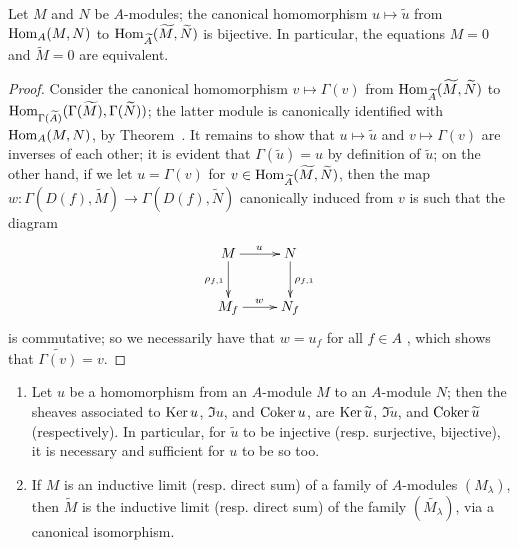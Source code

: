 \begin{corollary}[1.3.8]
\label{I.1.3.8}
Let $M$ and $N$ be $A$-modules;
the canonical homomorphism $u\mapsto\widetilde{u}$ from $\operatorname{Hom}_A(M,N)$ to $\operatorname{Hom}_{\widetilde{A}}(\widetilde{M},\widetilde{N})$ is bijective.
In particular, the equations $M=0$ and $\widetilde{M}=0$ are equivalent.
\end{corollary}

\begin{proof}
Consider the canonical homomorphism $v\mapsto\Gamma(v)$ from $\operatorname{Hom}_{\widetilde{A}}(\widetilde{M},\widetilde{N})$ to $\operatorname{Hom}_{\Gamma(\widetilde{A})}(\Gamma(\widetilde{M}),\Gamma(\widetilde{N}))$;
the latter module is canonically identified with $\operatorname{Hom}_A(M,N)$, by Theorem~.
It remains to show that $u\mapsto\widetilde{u}$ and $v\mapsto\Gamma(v)$ are inverses of each other;
it is evident that $\Gamma(\widetilde{u})=u$ by definition of $\widetilde{u}$;
on the other hand, if we let $u=\Gamma(v)$ for $v\in\operatorname{Hom}_{\widetilde{A}}(\widetilde{M},\widetilde{N})$, then the map $w:\Gamma(D(f),\widetilde{M})\to\Gamma(D(f),\widetilde{N})$ canonically induced from $v$ is such that the diagram
\[
  \xymatrix{
    M\ar[r]^u\ar[d]_{\rho_{f,1}} & N\ar[d]^{\rho_{f,1}}\\
    M_f\ar[r]^w & N_f
  }
\]
is commutative;
so we necessarily have that $w=u_f$ for all $f\in A$ , which shows that $\widetilde{\Gamma(v)}=v$.
\end{proof}

\begin{corollary}[1.3.9]
\label{I.1.3.9}
\medskip\noindent
\begin{enumerate}
  \item[{\rm(i)}] Let $u$ be a homomorphism from an $A$-module $M$ to an $A$-module $N$;
    then the sheaves associated to $\operatorname{Ker} u$, $\Im u$, and $\operatorname{Coker} u$, are $\operatorname{Ker}\widetilde{u}$, $\Im\widetilde{u}$, and $\operatorname{Coker}\widetilde{u}$ (respectively).
    In particular, for $\widetilde{u}$ to be injective (resp. surjective, bijective), it is necessary and sufficient for $u$ to be so too.
  \item[{\rm(ii)}] If $M$ is an inductive limit (resp. direct sum) of a family of $A$-modules $(M_\lambda)$, then $\widetilde{M}$ is the inductive limit (resp. direct sum) of the family $(\widetilde{M_\lambda})$, via a canonical isomorphism.
\end{enumerate}
\end{corollary}

